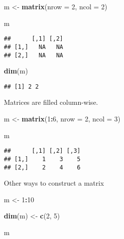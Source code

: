 \documentclass[
]{book}
\newenvironment{Shaded}{\begin{snugshade}}{\end{snugshade}}
\newcommand{\DataTypeTok}[1]{\textcolor[rgb]{0.13,0.29,0.53}{#1}}
\newcommand{\DecValTok}[1]{\textcolor[rgb]{0.00,0.00,0.81}{#1}}
\newcommand{\KeywordTok}[1]{\textcolor[rgb]{0.13,0.29,0.53}{\textbf{#1}}}
\newcommand{\NormalTok}[1]{#1}
\newcommand{\OperatorTok}[1]{\textcolor[rgb]{0.81,0.36,0.00}{\textbf{#1}}}
\newcommand{\StringTok}[1]{\textcolor[rgb]{0.31,0.60,0.02}{#1}}
\begin{document}
\begin{Shaded}
\begin{Highlighting}[]
\NormalTok{m \textless{}{-}}\StringTok{ }\KeywordTok{matrix}\NormalTok{(}\DataTypeTok{nrow =} \DecValTok{2}\NormalTok{, }\DataTypeTok{ncol =} \DecValTok{2}\NormalTok{)}

\NormalTok{m}
\end{Highlighting}
\end{Shaded}

\begin{verbatim}
##      [,1] [,2]
## [1,]   NA   NA
## [2,]   NA   NA
\end{verbatim}

\begin{Shaded}
\begin{Highlighting}[]
\KeywordTok{dim}\NormalTok{(m)}
\end{Highlighting}
\end{Shaded}

\begin{verbatim}
## [1] 2 2
\end{verbatim}

Matrices are filled column-wise.

\begin{Shaded}
\begin{Highlighting}[]
\NormalTok{m \textless{}{-}}\StringTok{ }\KeywordTok{matrix}\NormalTok{(}\DecValTok{1}\OperatorTok{:}\DecValTok{6}\NormalTok{, }\DataTypeTok{nrow =} \DecValTok{2}\NormalTok{, }\DataTypeTok{ncol =} \DecValTok{3}\NormalTok{)}

\NormalTok{m}
\end{Highlighting}
\end{Shaded}

\begin{verbatim}
##      [,1] [,2] [,3]
## [1,]    1    3    5
## [2,]    2    4    6
\end{verbatim}

Other ways to construct a matrix

\begin{Shaded}
\begin{Highlighting}[]
\NormalTok{m \textless{}{-}}\StringTok{ }\DecValTok{1}\OperatorTok{:}\DecValTok{10}

\KeywordTok{dim}\NormalTok{(m) \textless{}{-}}\StringTok{ }\KeywordTok{c}\NormalTok{(}\DecValTok{2}\NormalTok{, }\DecValTok{5}\NormalTok{)}

\NormalTok{m}
\end{Highlighting}
\end{Shaded}
\end{document}
